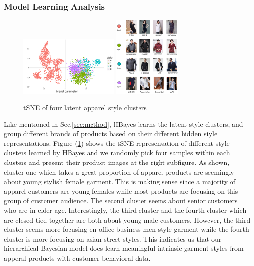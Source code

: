 \subsubsection{Model Learning Analysis}
\begin{figure}
\includegraphics[width=0.58\columnwidth,height=3cm]{fig/brand_tsne}
\includegraphics[width=0.39\columnwidth,height=4cm]{fig/style-brand}
\caption{tSNE of four latent apparel style clusters}
\label{fig:tsne-represntation-style-cluster}
\end{figure}

Like mentioned in Sec.\ref{sec:method}, HBayes learns the latent style clusters, and group different brands of products based on their different hidden style representations.  Figure (\ref{fig:tsne-represntation-style-cluster}) shows the tSNE\cite{maaten2008visualizing} representation of different style clusters learned by HBayes and we randomly pick four samples within each clusters and present their product images at the right subfigure.  As shown, cluster one which takes a great proportion of apparel products are seemingly about young stylish female garment.  This is making sense since a majority of apparel customers are young females while most products are focusing on this group of customer audience.    The second cluster seems about senior customers who are in elder age.   Interestingly, the third cluster and the fourth cluster which are closed tied together are both about young male customers.  However, the third cluster seems more focusing on office business men style garment while the fourth cluster is more focusing on asian street styles.  This indicates us that our hierarchical Bayesian model does learn meaningful intrinsic garment styles from apperal products with customer behavioral data.   

